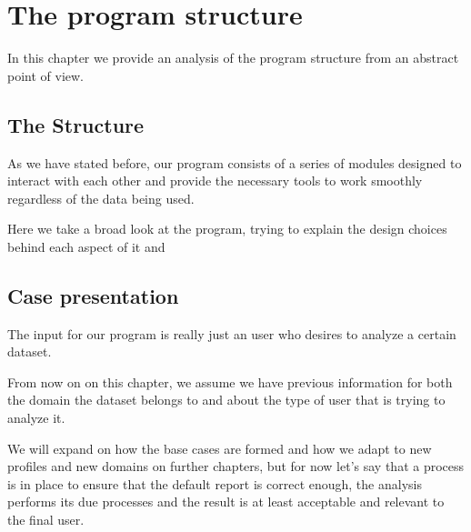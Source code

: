 %
%

\chapter{The program structure}

\begin{resumen}
In this chapter we provide an analysis of the program structure from an abstract point of view.
\end{resumen}

\linespread{1.6}

\section{The Structure}
\label{cap2:sec:structure}

As we have stated before, our program consists of a series of modules designed to interact with each other and provide the necessary tools to work smoothly regardless of the data being used.

Here we take a broad look at the program, trying to explain the design choices behind each aspect of it and 

\section{Case presentation}
\label{cap2:sec:preparation}

The input for our program is really just an user who desires to analyze a certain dataset.

From now on on this chapter, we assume we have previous information for both the domain the dataset belongs to and about the type of user that is trying to analyze it.

We will expand on how the base cases are formed and how we adapt to new profiles and new domains on further chapters, but for now let's say that a process is in place to ensure that the default report is correct enough, the analysis performs its due processes and the result is at least acceptable and relevant to the final user.

